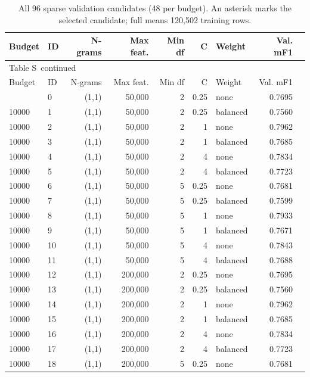 \documentclass[10pt,a4paper]{article}
\renewcommand{\thetable}{S\arabic{table}}
\begin{document}
{\footnotesize
\setlength{\tabcolsep}{4pt}
\begin{longtable}{@{}llrrrrlrl@{}}
\caption{All 96 sparse validation candidates (48 per budget). An asterisk marks the selected candidate; full means 120,502 training rows.}\label{sup:tfidf-search}\\
\toprule
Budget & ID & N-grams & Max feat. & Min df & C & Weight & Val. mF1 &  \\
\midrule\endfirsthead
\multicolumn{9}{l}{\small Table \thetable\ continued}\\
\toprule
Budget & ID & N-grams & Max feat. & Min df & C & Weight & Val. mF1 &  \\
\midrule\endhead
\bottomrule\endfoot
10000 & 0 & (1,1) & 50,000 & 2 & 0.25 & none & 0.7695 &  \\
10000 & 1 & (1,1) & 50,000 & 2 & 0.25 & balanced & 0.7560 &  \\
10000 & 2 & (1,1) & 50,000 & 2 & 1 & none & 0.7962 &  \\
10000 & 3 & (1,1) & 50,000 & 2 & 1 & balanced & 0.7685 &  \\
10000 & 4 & (1,1) & 50,000 & 2 & 4 & none & 0.7834 &  \\
10000 & 5 & (1,1) & 50,000 & 2 & 4 & balanced & 0.7723 &  \\
10000 & 6 & (1,1) & 50,000 & 5 & 0.25 & none & 0.7681 &  \\
10000 & 7 & (1,1) & 50,000 & 5 & 0.25 & balanced & 0.7599 &  \\
10000 & 8 & (1,1) & 50,000 & 5 & 1 & none & 0.7933 &  \\
10000 & 9 & (1,1) & 50,000 & 5 & 1 & balanced & 0.7671 &  \\
10000 & 10 & (1,1) & 50,000 & 5 & 4 & none & 0.7843 &  \\
10000 & 11 & (1,1) & 50,000 & 5 & 4 & balanced & 0.7688 &  \\
10000 & 12 & (1,1) & 200,000 & 2 & 0.25 & none & 0.7695 &  \\
10000 & 13 & (1,1) & 200,000 & 2 & 0.25 & balanced & 0.7560 &  \\
10000 & 14 & (1,1) & 200,000 & 2 & 1 & none & 0.7962 &  \\
10000 & 15 & (1,1) & 200,000 & 2 & 1 & balanced & 0.7685 &  \\
10000 & 16 & (1,1) & 200,000 & 2 & 4 & none & 0.7834 &  \\
10000 & 17 & (1,1) & 200,000 & 2 & 4 & balanced & 0.7723 &  \\
10000 & 18 & (1,1) & 200,000 & 5 & 0.25 & none & 0.7681 &  \\

\end{longtable}}
\end{document}
